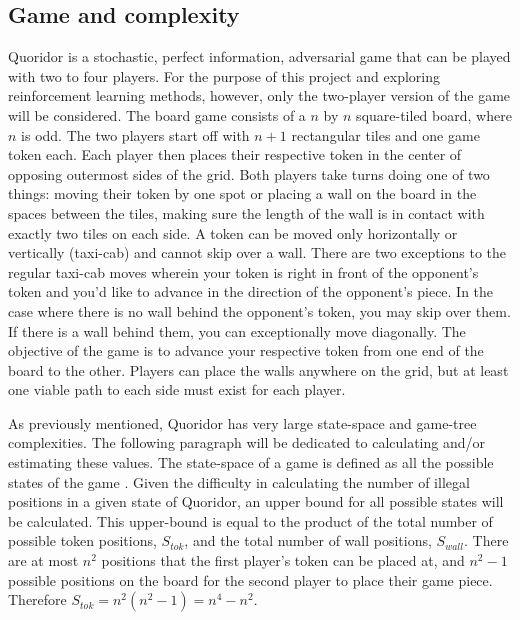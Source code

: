 \documentclass[journal, a4paper]{IEEEtran}
\begin{document}
\subsection{Game and complexity}
\label{ssec:complexity}

Quoridor is a stochastic, perfect information, adversarial game that can be played with two to four players. For the purpose of this project and exploring reinforcement learning methods, however, only the two-player version of the game will be considered. The board game consists of a $n$ by $n$ square-tiled board, where $n$ is odd. 
The two players start off with $n+1$ rectangular tiles and one game token each. Each player then places their respective token in the center of opposing outermost sides of the grid. Both players take turns doing one of two things: moving their token by one spot or placing a wall on the board in the spaces between the tiles, making sure the length of the wall is in contact with exactly two tiles on each side. 
A token can be moved only horizontally or vertically (taxi-cab) and cannot skip over a wall. There are two exceptions to the regular taxi-cab moves wherein your token is right in front of the opponent's token and you'd like to advance in the direction of the opponent's piece. In the case where there is no wall behind the opponent's token, you may skip over them. If there is a wall behind them, you can exceptionally move diagonally.
The objective of the game is to advance your respective token from one end of the board to the other. Players can place the walls anywhere on the grid, but at least one viable path to each side must exist for each player. 

As previously mentioned, Quoridor has very large state-space and game-tree complexities. The following paragraph will be dedicated to calculating and/or estimating these values. 
The state-space of a game is defined as all the possible states of the game \cite{heuristic-agent}. Given the difficulty in calculating the number of illegal positions in a given state of Quoridor, an upper bound for all possible states will be calculated. 
This upper-bound is equal to the product of the total number of possible token positions, $S_{tok}$, and the total number of wall positions, $S_{wall}$.  There are at most $n^{2}$ positions that the first player's token can be placed at, and $n^{2} -1$ possible positions on the board for the second player to place their game piece. Therefore $S_{tok} = n^{2}(n^{2}-1) = n^{4} - n^{2}$.
\end{document}
